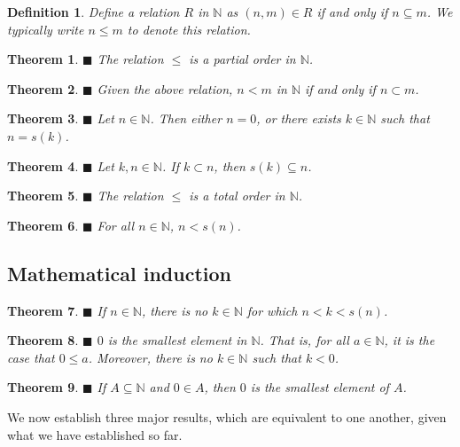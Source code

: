 \documentclass[a4paper]{article}
\newtheorem{mytheorem}{Theorem}
\newtheorem{mydef}{Definition}
\numberwithin{mytheorem}{section}
\numberwithin{mydef}{section}
\numberwithin{axiom}{section}
\numberwithin{example}{section}
\newcommand{\done}{$\blacksquare$ }
\begin{document}
\begin{mydef} Define a relation $R$ in $\mathbb{N}$ as $(n,m) \in R$ if and only if $n \subseteq m$. We typically write $n \leq m$ to denote this relation. 
\end{mydef}

\begin{mytheorem} \done The relation $\leq$ is a partial order in $\mathbb{N}$. 
\end{mytheorem}

\begin{mytheorem} \done Given the above relation, $n < m$ in $\mathbb{N}$ if and only if $n \subset m$. 
\end{mytheorem}

\begin{mytheorem} \done Let $n \in \mathbb{N}$. Then either $n = 0$, or there exists $k \in \mathbb{N}$ such that $n = s(k)$.
\end{mytheorem}

\begin{mytheorem} \done Let $k,n \in \mathbb{N}$. If $k \subset n$, then $s(k) \subseteq n$.
\end{mytheorem}

\begin{mytheorem} \done The relation $\leq$ is a total order in $\mathbb{N}$. 
\end{mytheorem}

\begin{mytheorem} \done For all $n \in \mathbb{N}$, $n < s(n)$.
\end{mytheorem}

\subsection{Mathematical induction}

\begin{mytheorem} \done If $n \in \mathbb{N}$, there is no $k \in \mathbb{N}$ for which $n < k < s(n)$. 
\end{mytheorem}

\begin{mytheorem} \done $0$ is the smallest element in $\mathbb{N}$. That is, for all $a \in \mathbb{N}$, it is the case that $0 \leq a$. Moreover, there is no $k \in \mathbb{N}$ such that $k < 0$. 
\end{mytheorem}

\begin{mytheorem} \done If $A \subseteq \mathbb{N}$ and $0 \in A$, then $0$ is the smallest element of $A$.
\end{mytheorem}
We now establish three major results, which are equivalent to one another, given what we have established so far.
\end{document}
